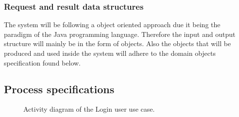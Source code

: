 \documentclass[12pt]{article}
\begin{document}
\subsubsection{Request and result data structures}
The system will be following a object oriented approach due it being the paradigm of the Java programming language. Therefore the input and output structure will mainly be in the form of objects. Also the objects that will be produced and used inside the system will adhere to the domain objects specification found below.

\vspace{0.2in}
\newpage
\subsection{Process specifications}
\vspace{0.2in}

\begin{figure}[H]
\centering	
{}
\caption{Activity diagram of the Login user use case.}
\end{figure}
\end{document}
